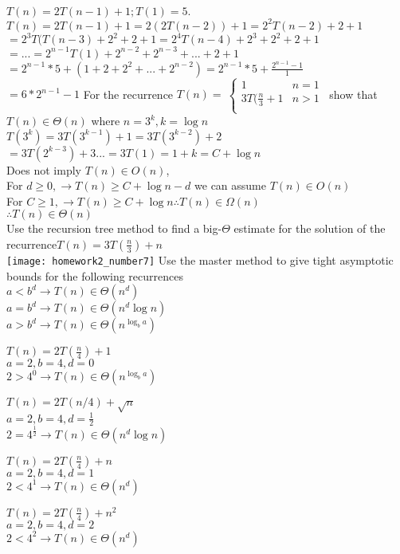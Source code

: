 \documentclass[12pt,largemargins]{homework}
\begin{document}
\question
$T ( n ) = 2 T ( n-1 ) + 1 ; T ( 1 ) = 5 .$\\
$T(n) = 2T(n-1)+1 =  2(2T(n-2))+1 = 2^2T(n-2)+2+1$\\
$=2^3T(T(n-3)+2^2+2+1 = 2^4T(n-4)+2^3+2^2+2+1$\\
$=...=2^{n-1}T(1)+2^{n-2}+2^{n-3}+...+2+1$\\
$=2^{n-1}*5+(1+2+2^2+...+2^{n-2})=2^{n-1}*5+\frac{2^{n-1}-1}{1}$\\
$=6*2^{n-1}-1$
\question
For the recurrence $T(n)=
\ \begin{cases} 
      1 & n =1\\
      3T(\frac{n}{3} +1 & n >1\\
   \end{cases}
\,$ show that $T(n) \in \Theta(n)$
where $n=3^k, k = \log n$\\
$ T(3^k) = 3T(3^{k-1}) +1 = 3T(3^{k-2}) + 2$\\
$ =3T(2^{k-3}) + 3 ... = 3T(1) = 1 + k = C + \log n $\\
Does not imply $ T(n) \in O(n) $, \\
For $ d \geq 0, \rightarrow T(n) \geq C+\log n -d$ we can assume $T(n) \in O(n) $\\
For $ C \geq 1, \rightarrow T(n) \geq C+\log n \therefore T(n) \in \Omega(n) $\\
$ \therefore T(n) \in \Theta(n) $\\
\newpage
\question
Use the recursion tree method to find a big-$ \Theta $ estimate for the solution of the recurrence$ T(n)=3T(\frac{n}{3})+n $\\
\texttt{[image: homework2\_number7]}
\question
Use the master method to give tight asymptotic bounds for the following recurrences\\
$ a < b^d \rightarrow T(n) \in  \Theta(n^d)$\\
$ a=b^d  \rightarrow T(n) \in \Theta (n^d\log n)$\\
$ a>b^d \rightarrow T(n) \in \Theta(n^{\log_b a}) $\\
\begin{alphaparts}
	\item 
	$ T(n) = 2T(\frac{n}{4})+1 $\\
	$ a = 2, b = 4, d=0 $\\
	$ 2 > 4^0 \rightarrow T(n) \in \Theta(n^{\log_b a})$\\
	\item 
	$ T(n)=2T(n/4) + \sqrt{n} $\\
	$ a=2,b=4,d=\frac{1}{2} $\\
	$ 2=4^{\frac{1}{2}} \rightarrow T(n) \in \Theta(n^d\log n) $\\
	\item 
	$ T(n) = 2T(\frac{n}{4})+n $\\
	$ a = 2, b = 4, d=1 $\\
	$ 2 < 4^1 \rightarrow T(n) \in \Theta(n^d)$\\
	\item 
	$ T(n) = 2T(\frac{n}{4})+n^2 $\\
	$ a = 2, b = 4, d=2 $\\
	$ 2 < 4^2 \rightarrow T(n) \in \Theta(n^d)$\\
\end{alphaparts}
\end{document}
